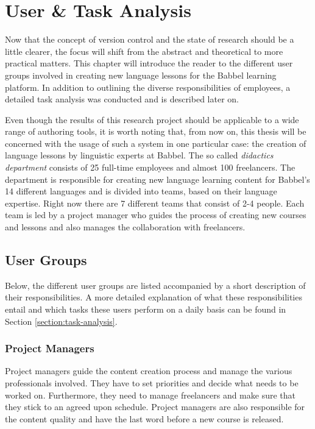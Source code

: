 \chapter{User \& Task Analysis} \label{chapter:user-research}
Now that the concept of version control and the state of research should be a little clearer, the focus will shift from the abstract and theoretical to more practical matters. This chapter will introduce the reader to the different user groups involved in creating new language lessons for the Babbel learning platform. In addition to outlining the diverse responsibilities of employees, a detailed task analysis was conducted and is described later on.

Even though the results of this research project should be applicable to a wide range of authoring tools, it is worth noting that, from now on, this thesis will be concerned with the usage of such a system in one particular case: the creation of language lessons by linguistic experts at Babbel. The so called \textit{didactics department} consists of 25 full-time employees and almost 100 freelancers. The department is responsible for creating new language learning content for Babbel's 14 different languages and is divided into teams, based on their language expertise. Right now there are 7 different teams that consist of 2-4 people. Each team is led by a project manager who guides the process of creating new courses and lessons and also manages the collaboration with freelancers.

\section{User Groups}
Below, the different user groups are listed accompanied by a short description of their responsibilities. A more detailed explanation of what these responsibilities entail and which tasks these users perform on a daily basis can be found in Section \ref{section:task-analysis}.

\subsection{Project Managers} \label{sec:project-managers}
Project managers guide the content creation process and manage the various professionals involved. They have to set priorities and decide what needs to be worked on. Furthermore, they need to manage freelancers and make sure that they stick to an agreed upon schedule. Project managers are also responsible for the content quality and have the last word before a new course is released.

